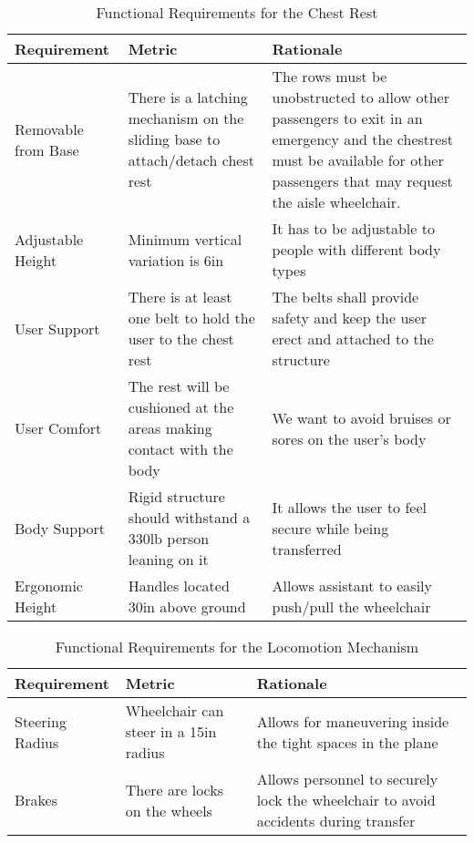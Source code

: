 \begin{table}
\begin{tabular} {| p{4cm} | p{5cm} | p{5cm} |}
\hline
\textbf{Requirement} & \textbf{Metric} & \textbf{Rationale} \\ \hline

Removable from Base &  There is a latching mechanism on the sliding base to attach/detach chest rest & The rows must be unobstructed to allow other passengers to exit in an emergency and the chestrest must be available for other passengers that may request the aisle wheelchair. \\ \hline
Adjustable Height & Minimum vertical variation is 6in & It has to be adjustable to people with different body types\\ \hline
User Support &  There is at least one belt to hold the user to the chest rest & The belts shall provide safety and keep the user erect and attached to the structure \\ \hline
User Comfort & The rest will be cushioned at the areas making contact with the body & We want to avoid bruises or sores on the user's  body \\ \hline
Body Support & Rigid structure should withstand a 330lb person leaning on it & It allows the user to feel secure while being transferred
\\ \hline
Ergonomic Height & Handles located 30in above ground & Allows assistant to easily push/pull the wheelchair \\ \hline
\end{tabular} 
\caption{Functional Requirements for the Chest Rest}
\label{tab:functional_requirements_chestrest}
\end{table}


\begin{table}
\begin{tabular} {| p{4cm} | p{5cm} | p{5cm} |}
\hline
\textbf{Requirement} & \textbf{Metric} & \textbf{Rationale} \\ \hline


Steering Radius &  Wheelchair can steer in a 15in radius & Allows for maneuvering inside the tight spaces in the plane \\ \hline
Brakes & There are locks on the wheels & Allows personnel to securely lock the wheelchair to avoid accidents during transfer  \\ \hline
\end{tabular} 
\caption{Functional Requirements for the Locomotion Mechanism}
\label{tab:functional_requirements_locomotion}
\end{table}

